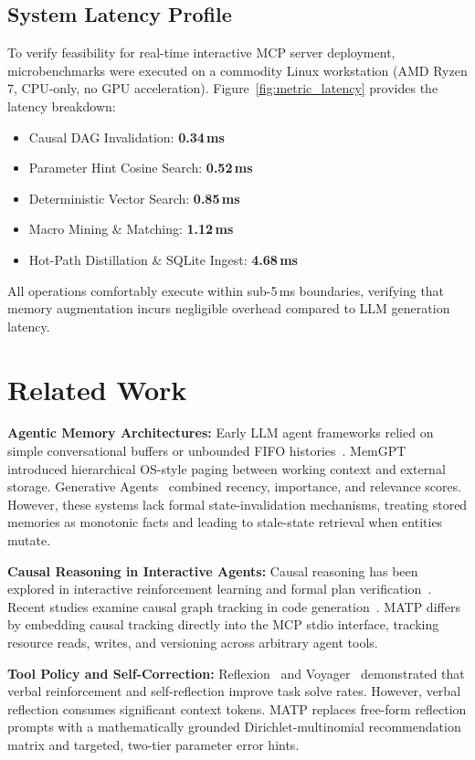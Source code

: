 \documentclass[10pt,journal,compsoc]{IEEEtran}
\begin{document}
\subsection{System Latency Profile}
To verify feasibility for real-time interactive MCP server deployment, microbenchmarks were executed on a commodity Linux workstation (AMD Ryzen 7, CPU-only, no GPU acceleration). Figure~\ref{fig:metric_latency} provides the latency breakdown:
\begin{itemize}
    \item Causal DAG Invalidation: \textbf{0.34\,ms}
    \item Parameter Hint Cosine Search: \textbf{0.52\,ms}
    \item Deterministic Vector Search: \textbf{0.85\,ms}
    \item Macro Mining \& Matching: \textbf{1.12\,ms}
    \item Hot-Path Distillation \& SQLite Ingest: \textbf{4.68\,ms}
\end{itemize}
All operations comfortably execute within sub-5\,ms boundaries, verifying that memory augmentation incurs negligible overhead compared to LLM generation latency.

\section{Related Work}
\label{sec:related_work}

\textbf{Agentic Memory Architectures:} Early LLM agent frameworks relied on simple conversational buffers or unbounded FIFO histories~\cite{wang2023survey}. MemGPT~\cite{packer2023memgpt} introduced hierarchical OS-style paging between working context and external storage. Generative Agents~\cite{park2023generative} combined recency, importance, and relevance scores. However, these systems lack formal state-invalidation mechanisms, treating stored memories as monotonic facts and leading to stale-state retrieval when entities mutate.

\textbf{Causal Reasoning in Interactive Agents:} Causal reasoning has been explored in interactive reinforcement learning and formal plan verification~\cite{pearl2009causality}. Recent studies examine causal graph tracking in code generation~\cite{jimenez2024swebench}. MATP differs by embedding causal tracking directly into the MCP stdio interface, tracking resource reads, writes, and versioning across arbitrary agent tools.

\textbf{Tool Policy and Self-Correction:} Reflexion~\cite{shinn2023reflexion} and Voyager~\cite{wang2023voyager} demonstrated that verbal reinforcement and self-reflection improve task solve rates. However, verbal reflection consumes significant context tokens. MATP replaces free-form reflection prompts with a mathematically grounded Dirichlet-multinomial recommendation matrix and targeted, two-tier parameter error hints.
\end{document}
